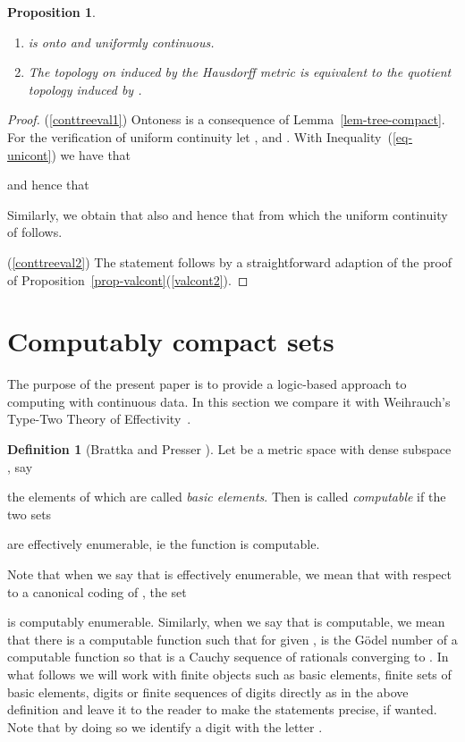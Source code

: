 \documentclass[microtype]{jloganal}
\theoremstyle{plain}
\newtheorem{proposition}[theorem]{Proposition}
\theoremstyle{definition}
\newtheorem{definition}[theorem]{Definition}
\begin{document}
\begin{proposition}\label{prop-conttreeval}
\begin{enumerate}
\item\label{conttreeval1}
 is onto and uniformly 
continuous.
\item\label{conttreeval2}
The topology on  induced by the Hausdorff metric is equivalent 
to the quotient topology induced by .
\end{enumerate}
\end{proposition}
\begin{proof}
(\ref{conttreeval1}) Ontoness is a consequence of Lemma~\ref{lem-tree-compact}. For the verification of uniform continuity let ,  and . With Inequality~(\ref{eq-unicont}) we have that

and hence that

Similarly, we obtain that also  and hence that  from which the uniform continuity of  follows.

(\ref{conttreeval2}) The statement follows by a straightforward adaption
of the proof of Proposition~\ref{prop-valcont}(\ref{valcont2}).
\end{proof}


\section{Computably compact sets}
\label{sec-computable}

The purpose of the present paper is to provide a logic-based approach to 
computing with continuous data. In this section we compare it with 
Weihrauch's Type-Two Theory of Effectivity~\cite{Weihrauch00}.

\begin{definition}[{\rm Brattka and Presser \cite{BrattkaPresser03}}]
\label{met-computable}
Let  be a metric space with dense subspace , say

the elements of which are called \emph{basic elements}.
Then  is called \emph{computable} if the two sets

are effectively enumerable, ie the function  is computable.
\end{definition}

Note that when we say that  is effectively enumerable, we mean that with respect to a canonical coding  of , the set

is computably enumerable. Similarly, when we say that  is computable, we mean that there is a computable function  such that for given ,  is the G\"odel number of a computable function  so that  is a Cauchy sequence of rationals converging to . In what follows we will work with  finite objects such as basic elements, finite sets of basic elements, digits or finite sequences of digits directly as in the above definition and leave it to the reader to make the statements precise, if wanted. Note that by doing so we identify a digit  with the letter . 
\end{document}
